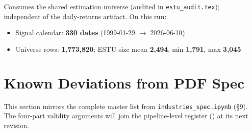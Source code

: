\documentclass[11pt,a4paper]{article}
\begin{document}
Consumes the shared estimation universe 
(audited in \texttt{estu\_audit.tex}); independent of the daily-returns
artifact. On this run:

\begin{itemize}[leftmargin=*,topsep=2pt,itemsep=2pt]
  \item Signal calendar: \textbf{330 dates} (1999-01-29 $\to$ 2026-06-10)
  \item Universe rows: \textbf{1{,}773{,}820}; ESTU size mean \textbf{2{,}494},
    min \textbf{1{,}791}, max \textbf{3{,}045}
\end{itemize}

\section{Known Deviations from PDF Spec}

This section mirrors the complete master list from
\texttt{industries\_spec.ipynb} (\S9). The four-part validity
arguments will join the pipeline-level register
() at its next revision.
\end{document}
